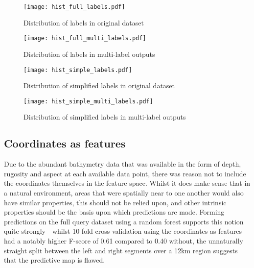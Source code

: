 
\begin{figure}[H]
    \begin{minipage}{.49\linewidth}
        \texttt{[image: hist\_full\_labels.pdf]}
        \caption{Distribution of labels in original dataset}
        \label{fig:singlelabeldistr}
    \end{minipage}
    \hfill
    \begin{minipage}{.49\linewidth}
        \texttt{[image: hist\_full\_multi\_labels.pdf]}
        \caption{Distribution of labels in multi-label outputs}
        \label{fig:multilabeldistr}
    \end{minipage}
\end{figure}

\begin{figure}[H]
    \begin{minipage}{.49\linewidth}
        \texttt{[image: hist\_simple\_labels.pdf]}
        \caption{Distribution of simplified labels in original dataset}
        \label{fig:singlelabeldistr}
    \end{minipage}
    \hfill
    \begin{minipage}{.49\linewidth}
        \texttt{[image: hist\_simple\_multi\_labels.pdf]}
        \caption{Distribution of simplified labels in multi-label outputs}
        \label{fig:multilabeldistr}
    \end{minipage}
\end{figure}

\subsection{Coordinates as features}
Due to the abundant bathymetry data that was available in the form of depth, rugosity and aspect at each available data point, there was reason not to include the coordinates themselves in the feature space. Whilst it does make sense that in a natural environment, areas that were spatially near to one another would also have similar properties, this should not be relied upon, and other intrinsic properties should be the basis upon which predictions are made. Forming predictions on the full query dataset using a random forest supports this notion quite strongly - whilst 10-fold cross validation using the coordinates as features had a notably higher F-score of 0.61 compared to 0.40 without, the unnaturally straight split between the left and right segments over a 12km region suggests that the predictive map is flawed. 

